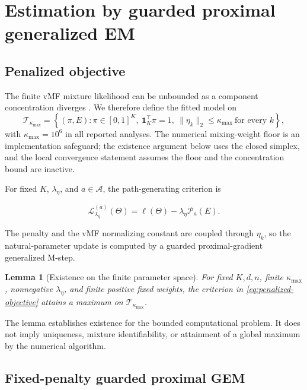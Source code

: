 \documentclass[preprint,12pt,authoryear]{elsarticle}
\newtheorem{lemma}{Lemma}
\newcounter{algorithm}
\begin{document}
\section{Estimation by guarded proximal generalized EM}
\label{sec:estimation}

\subsection{Penalized objective}

The finite vMF mixture likelihood can be unbounded as a component
concentration diverges \citep{ng2023penalizedvmf}. We therefore define the
fitted model on
\[
\mathcal T_{\kappa_{\max}}
=\left\{(\pi,E):\pi\in[0,1]^K,\ \mathbf1_K^\top\pi=1,\
\lVert\eta_k\rVert_2\leq\kappa_{\max}\ \text{for every }k\right\},
\]
with $\kappa_{\max}=10^6$ in all reported analyses. The numerical mixing-weight
floor is an implementation safeguard; the existence argument below uses the
closed simplex, and the local convergence statement assumes the floor and the
concentration bound are inactive.

For fixed $K$, $\lambda_\eta$, and $a\in\mathcal A$, the path-generating
criterion is

\begin{equation}
\label{eq:penalized-objective}
\mathcal L_{\lambda_\eta}^{(a)}(\Theta)
=\ell(\Theta)-\lambda_\eta\mathcal P_a(E).
\end{equation}

The penalty and the vMF normalizing constant are coupled through $\eta_k$, so
the natural-parameter update is computed by a guarded
proximal-gradient generalized M-step.

\begin{lemma}[Existence on the finite parameter space]
\label{lem:finite-existence}
For fixed $K,d,n$, finite $\kappa_{\max}$, nonnegative $\lambda_\eta$, and
finite positive fixed weights, the criterion in
\eqref{eq:penalized-objective} attains a maximum on
$\mathcal T_{\kappa_{\max}}$.
\end{lemma}

The lemma establishes existence for the bounded computational problem. It
does not imply uniqueness, mixture identifiability, or attainment of a global
maximum by the numerical algorithm.

\subsection{Fixed-penalty guarded proximal GEM}
\label{sec:fixed-gem}
\end{document}
